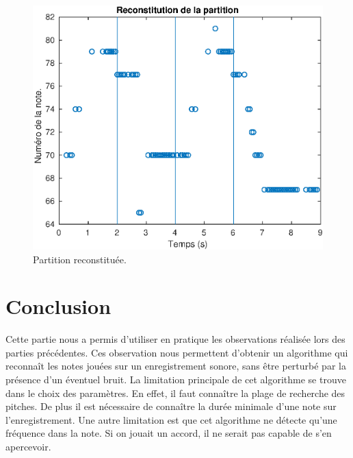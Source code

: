 \documentclass[french]{article}
\begin{document}
\begin{figure}[h!]
	\centering
	\includegraphics[width=\textwidth]{images/notes.eps}
	\caption{Partition reconstituée.}
	\label{fig:notes}
\end{figure}

\section*{Conclusion}

Cette partie nous a permis d'utiliser en pratique les observations réalisée lors des parties précédentes. Ces observation nous permettent d'obtenir un algorithme qui reconnaît les notes jouées sur un enregistrement sonore, sans être perturbé par la présence d'un éventuel bruit. La limitation principale de cet algorithme se trouve dans le choix des paramètres. En effet, il faut connaître la plage de recherche des pitches. De plus il est nécessaire de connaître la durée minimale d'une note sur l'enregistrement. Une autre limitation est que cet algorithme ne détecte qu'une fréquence dans la note. Si on jouait un accord, il ne serait pas capable de s'en apercevoir. 
\end{document}
